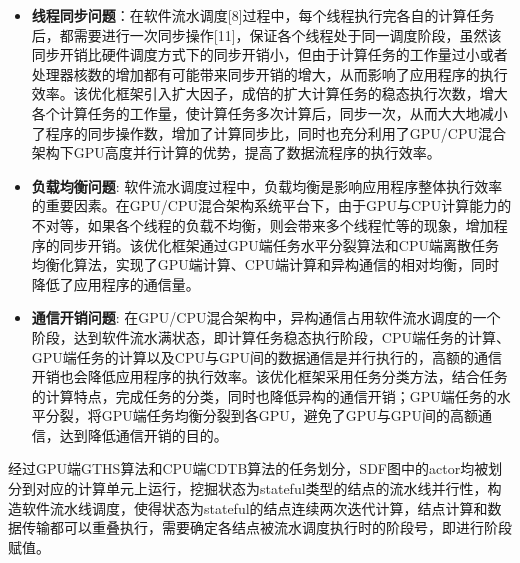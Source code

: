 \begin{itemize}	
  \item {\bf 线程同步问题}：在软件流水调度[8]过程中，每个线程执行完各自的计算任务后，都需要进行一次同步操作[11]，保证各个线程处于同一调度阶段，虽然该同步开销比硬件调度方式下的同步开销小，但由于计算任务的工作量过小或者处理器核数的增加都有可能带来同步开销的增大，从而影响了应用程序的执行效率。该优化框架引入扩大因子，成倍的扩大计算任务的稳态执行次数，增大各个计算任务的工作量，使计算任务多次计算后，同步一次，从而大大地减小了程序的同步操作数，增加了计算同步比，同时也充分利用了GPU/CPU混合架构下GPU高度并行计算的优势，提高了数据流程序的执行效率。

  \item {\bf 负载均衡问题}: 软件流水调度过程中，负载均衡是影响应用程序整体执行效率的重要因素。在GPU/CPU混合架构系统平台下，由于GPU与CPU计算能力的不对等，如果各个线程的负载不均衡，则会带来多个线程忙等的现象，增加程序的同步开销。该优化框架通过GPU端任务水平分裂算法和CPU端离散任务均衡化算法，实现了GPU端计算、CPU端计算和异构通信的相对均衡，同时降低了应用程序的通信量。
  
  \item {\bf 通信开销问题}: 在GPU/CPU混合架构中，异构通信占用软件流水调度的一个阶段，达到软件流水满状态，即计算任务稳态执行阶段，CPU端任务的计算、GPU端任务的计算以及CPU与GPU间的数据通信是并行执行的，高额的通信开销也会降低应用程序的执行效率。该优化框架采用任务分类方法，结合任务的计算特点，完成任务的分类，同时也降低异构的通信开销；GPU端任务的水平分裂，将GPU端任务均衡分裂到各GPU，避免了GPU与GPU间的高额通信，达到降低通信开销的目的。
\end{itemize}

经过GPU端GTHS算法和CPU端CDTB算法的任务划分，SDF图中的actor均被划分到对应的计算单元上运行，挖掘状态为stateful类型的结点的流水线并行性，构造软件流水线调度，使得状态为stateful的结点连续两次迭代计算，结点计算和数据传输都可以重叠执行，需要确定各结点被流水调度执行时的阶段号，即进行阶段赋值。

